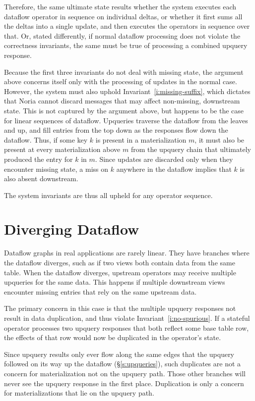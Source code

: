 Therefore, the same ultimate state results whether the system executes each
dataflow operator in sequence on individual deltas, or whether it first sums all
the deltas into a single update, and then executes the operators in sequence
over that. Or, stated differently, if normal dataflow processing does not
violate the correctness invariants, the same must be true of processing a
combined upquery response.

Because the first three invariants do not deal with missing state, the argument
above concerns itself only with the processing of updates in the normal case.
However, the system must also uphold Invariant~\ref{i:missing-suffix}, which
dictates that Noria cannot discard messages that may affect non-missing,
downstream state. This is not captured by the argument above, but happens to be
the case for linear sequences of dataflow. Upqueries traverse the dataflow from
the leaves and up, and fill entries from the top down as the responses flow down
the dataflow. Thus, if some key $k$ is present in a materialization $m$, it must
also be present at every materialization above $m$ from the upquery chain that
ultimately produced the entry for $k$ in $m$. Since updates are discarded only
when they encounter missing state, a miss on $k$ anywhere in the dataflow
implies that $k$ is also absent downstream.

The system invariants are thus all upheld for any operator sequence.

\section{Diverging Dataflow}
\label{s:partial:diverging}

Dataflow graphs in real applications are rarely linear. They have branches where
the dataflow diverges, such as if two views both contain data from the same
table. When the dataflow diverges, upstream operators may receive multiple
upqueries for the same data. This happens if multiple downstream views encounter
missing entries that rely on the same upstream data.

The primary concern in this case is that the multiple upquery responses not
result in data duplication, and thus violate Invariant~\ref{i:no-spurious}. If a
stateful operator processes two upquery responses that both reflect some base
table row, the effects of that row would now be duplicated in the operator's
state.

Since upquery results only ever flow along the same edges that the upquery
followed on its way up the dataflow (\S\ref{s:upqueries}), such duplicates are
not a concern for materialization not on the upquery path. Those other branches
will never see the upquery response in the first place. Duplication is only a
concern for materializations that lie on the upquery path.


